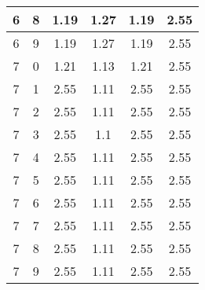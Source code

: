 \begin{longtable}{|c|c||c||c||c|c|}
	6 & 8 & 1.19 & 1.27 & 1.19 & 2.55 \\ \hline
	6 & 9 & 1.19 & 1.27 & 1.19 & 2.55 \\ \hline
	7 & 0 & 1.21 & 1.13 & 1.21 & 2.55 \\ \hline
	7 & 1 & 2.55 & 1.11 & 2.55 & 2.55 \\ \hline
	7 & 2 & 2.55 & 1.11 & 2.55 & 2.55 \\ \hline
	7 & 3 & 2.55 & 1.1 & 2.55 & 2.55 \\ \hline
	7 & 4 & 2.55 & 1.11 & 2.55 & 2.55 \\ \hline
	7 & 5 & 2.55 & 1.11 & 2.55 & 2.55 \\ \hline
	7 & 6 & 2.55 & 1.11 & 2.55 & 2.55 \\ \hline
	7 & 7 & 2.55 & 1.11 & 2.55 & 2.55 \\ \hline
	7 & 8 & 2.55 & 1.11 & 2.55 & 2.55 \\ \hline
	7 & 9 & 2.55 & 1.11 & 2.55 & 2.55 \\ \hline
\end{longtable}
\clearpage{}
